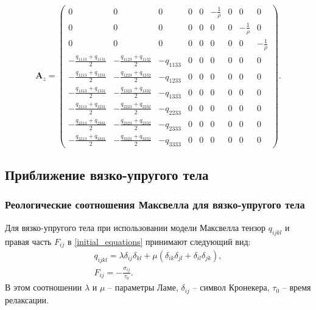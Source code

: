 \begin{displaymath}
\mathbf{A}_z =
\left( \begin{array}{cccccccccccc}
0 & 0 & 0 & 0 & 0 & -\frac 1 \rho & 0 & 0 & 0 \\ 
0 & 0 & 0 & 0 & 0 & 0 & 0 & -\frac 1 \rho & 0 \\ 
0 & 0 & 0 & 0 & 0 & 0 & 0 & 0 & -\frac 1 \rho \\ 
-\frac{q_{1113}+q_{1131}}{2} & -\frac{q_{1123}+q_{1132}}{2} & -q_{1133} & 0 & 0 & 0 & 0 & 0 & 0 \\ 
-\frac{q_{1213}+q_{1231}}{2} & -\frac{q_{1223}+q_{1232}}{2} & -q_{1233} & 0 & 0 & 0 & 0 & 0 & 0 \\ 
-\frac{q_{1313}+q_{1331}}{2} & -\frac{q_{1323}+q_{1332}}{2} & -q_{1333} & 0 & 0 & 0 & 0 & 0 & 0 \\ 
-\frac{q_{2213}+q_{2231}}{2} & -\frac{q_{2223}+q_{2232}}{2} & -q_{2233} & 0 & 0 & 0 & 0 & 0 & 0 \\ 
-\frac{q_{2313}+q_{2331}}{2} & -\frac{q_{2323}+q_{2332}}{2} & -q_{2333} & 0 & 0 & 0 & 0 & 0 & 0 \\ 
-\frac{q_{3313}+q_{3331}}{2} & -\frac{q_{3323}+q_{3332}}{2} & -q_{3333} & 0 & 0 & 0 & 0 & 0 & 0  
\end{array} \right).
\end{displaymath}


\clearpage
\newpage

\subsection{Приближение вязко-упругого тела}

\subsubsection{Реологические соотношения Максвелла для вязко-упругого тела}

Для вязко-упругого тела при использовании модели Максвелла тензор $q_{ijkl}$ и правая часть $F_{ij}$ в \ref{initial_equations} принимают следующий вид:
\begin{eqnarray}
\label{tensor_qijkl_viscosity}
q_{ijkl}=\lambda\delta_{ij}\delta_{kl}+\mu(\delta_{ik}\delta_{jl}+\delta_{il}
\delta_{jk}),\nonumber\\
F_{ij}=-\frac{\sigma_{ij}}{\tau_0}.
\end{eqnarray}
В этом соотношении $\lambda$ и $\mu$ -- параметры Ламе, $\delta_{ij}$ -- символ Кронекера, $\tau_0$ -- время релаксации.

